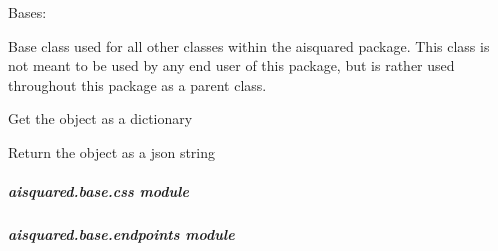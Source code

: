 \documentclass[letterpaper,10pt,english]{sphinxmanual}
\begin{document}
\begin{fulllineitems}
\label{\detokenize{aisquared.base:aisquared.base.BaseObject.BaseObject}}
\pysigstartsignatures
{}
\pysigstopsignatures
\sphinxAtStartPar
Bases: 

\sphinxAtStartPar
Base class used for all other classes within the aisquared package. This class is not meant
to be used by any end user of this package, but is rather used throughout this package as a
parent class.

\begin{fulllineitems}
\label{\detokenize{aisquared.base:aisquared.base.BaseObject.BaseObject.to_dict}}
\pysigstartsignatures
{}
\pysigstopsignatures
\sphinxAtStartPar
Get the object as a dictionary

\end{fulllineitems}


\begin{fulllineitems}
\label{\detokenize{aisquared.base:aisquared.base.BaseObject.BaseObject.to_json}}
\pysigstartsignatures
{}
\pysigstopsignatures
\sphinxAtStartPar
Return the object as a json string

\end{fulllineitems}


\end{fulllineitems}



\subparagraph{aisquared.base.css module}
\label{\detokenize{aisquared.base:module-aisquared.base.css}}\label{\detokenize{aisquared.base:aisquared-base-css-module}}

\subparagraph{aisquared.base.endpoints module}
\label{\detokenize{aisquared.base:aisquared-base-endpoints-module}}
\end{document}

